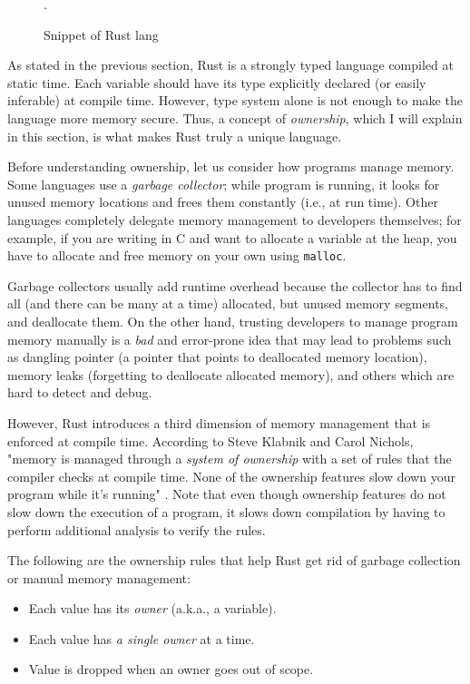 \begin{figure*}[ht]
    \begin{center}
    
    \end{center}
    \caption{Snippet of Rust lang \cite{rustbook}}.
    \label{rustex1}
\end{figure*}

As stated in the previous section, Rust is a strongly typed language compiled
at static time.  Each variable should have its type explicitly declared (or
easily inferable) at compile time. However, type system alone is not enough to
make the language more memory secure. Thus, a concept of \textit{ownership},
which I will explain in this section, is what makes Rust truly a unique
language.

Before understanding ownership, let us consider how programs manage memory.
Some languages use a \textit{garbage collector}; while program is running,
it looks for unused memory locations and frees them constantly (i.e., at
run time). Other languages completely delegate memory management to developers
themselves; for example, if you are writing in C and want to allocate a variable at
the heap, you have to allocate and free memory on your own using \texttt{malloc}.

Garbage collectors usually add runtime overhead because the collector has to find
all (and there can be many at a time) allocated, but unused memory segments,
and deallocate them. On the other hand, trusting developers to manage program
memory manually is a \textit{bad} and error-prone idea that may lead to problems such
as dangling pointer (a pointer that points to deallocated memory
location), memory leaks (forgetting to deallocate allocated memory), and others which
are hard to detect and debug.

However, Rust introduces a third dimension of memory management that is
enforced at compile time. According to Steve Klabnik and Carol Nichols, "memory
is managed through a \textit{system of ownership} with a set of rules that the
compiler checks at compile time. None of the ownership features slow down your
program while it's running" \cite{rustbook}. Note that even though ownership features do not
slow down the execution of a program, it slows down compilation by having to
perform additional analysis to verify the rules.

The following are the ownership rules that help Rust get rid of garbage collection
or manual memory management:

\begin{itemize}
    \item Each value has its \textit{owner} (a.k.a., a variable).
    \item Each value has \textit{a single owner} at a time.
    \item Value is dropped when an owner goes out of scope.
\end{itemize}

